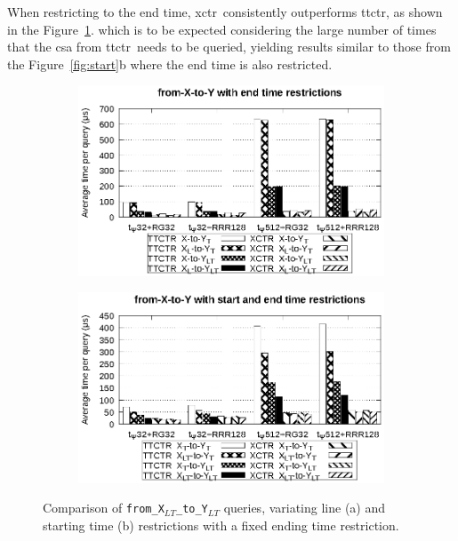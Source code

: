     When restricting to the end time, \gls{xctr}~consistently outperforms \gls{ttctr}, as shown in the Figure~\ref{fig:xy2}. which is to be expected considering the large number of times that the \gls{csa} from \gls{ttctr}~needs to be queried, yielding results similar to those from the Figure~\ref{fig:start}b where the end time is also restricted.
    
    \begin{figure}[ht]
    \begin{subfigure}{0.5\linewidth}
    \includegraphics[width=\linewidth]{experiments/xy2.eps}
    \vspace{-12pt}
    \caption{}
    \vspace{-12pt}
    \end{subfigure}%
    \begin{subfigure}{0.5\linewidth}
    \includegraphics[width=\linewidth]{experiments/xy3.eps}
    \vspace{-12pt}
    \caption{}
    \vspace{-12pt}
    \end{subfigure}
    \caption{Comparison of \texttt{from\_X$_{LT}$\_to\_Y$_{LT}$} queries, variating line (a) and starting time (b) restrictions with a fixed ending time restriction.}
    \label{fig:xy2}
    \end{figure}
    
